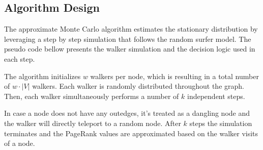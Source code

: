\subsection{Algorithm Design}

The approximate Monte Carlo algorithm estimates the stationary distribution by leveraging a step by step simulation that follows the random surfer model.
The pseudo code bellow presents the walker simulation and the decision logic used in each step.

\vspace{0.5em}
\begin{algorithm}[H]
\caption{Monte Carlo PageRank Approximation}

\end{algorithm}
\vspace{1.0em}

The algorithm initializes $w$ walkers per node, which is resulting in a total number of $w\cdot |V|$ walkers. Each walker is randomly distributed throughout the graph. Then, each walker simultaneously performs a number of $k$ independent steps.




In case a node does not have any outedges, it's treated as a dangling node and the walker will directly teleport to a random node.
After $k$ steps the simulation terminates and the PageRank values are approximated based on the walker visits of a node.\par

